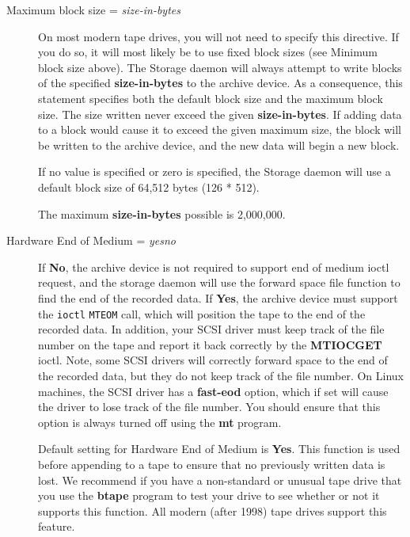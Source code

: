 \begin{description}
\item [Maximum block size = {\it size-in-bytes}]
   On most modern tape drives, you will not need to specify this directive.
   If you do so, it will most likely be to use fixed block sizes (see
   Minimum block size above).  The Storage daemon will always attempt to
   write blocks of the specified {\bf size-in-bytes} to the archive device.
   As a consequence, this statement specifies both the default block size
   and the maximum block size.  The size written never exceed the given
   {\bf size-in-bytes}.  If adding data to a block would cause it to exceed
   the given maximum size, the block will be written to the archive device,
   and the new data will begin a new block.
   
   If no value is specified or zero is specified, the Storage daemon will
   use a default block size of 64,512 bytes (126 * 512).

   The maximum {\bf size-in-bytes} possible is 2,000,000.

\item [Hardware End of Medium = {\it yes\vb{}no}]
   If {\bf No}, the archive device is not required to support end of medium
   ioctl request, and the storage daemon will use the forward space file
   function to find the end of the recorded data. If {\bf Yes}, the archive
   device must support the {\tt ioctl} {\tt MTEOM} call, which will position
   the tape to the end of the recorded data. In addition, your SCSI driver must
   keep track of the file number on the tape and report it back correctly by
   the {\bf MTIOCGET} ioctl. Note, some SCSI drivers will correctly forward
   space to the end of the recorded data, but they do not keep track of the
   file number.  On Linux machines, the SCSI driver has a {\bf fast-eod}
   option, which if set will cause the driver to lose track of the file
   number. You should ensure that this option is always turned off using the
   {\bf mt} program.
   
   Default setting for Hardware End of Medium is {\bf Yes}. This  function is
   used before appending to a tape to ensure that no  previously written data is
   lost. We recommend if you have a non-standard or unusual tape drive that you
   use the {\bf btape} program  to test your drive to see whether or not it
   supports this function.  All modern (after 1998) tape drives support this
   feature.  
   

\end{description}
